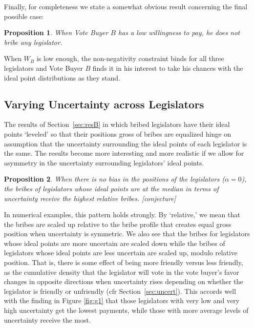 \documentclass[12pt]{article}
\newtheorem{proposition}{Proposition}
\newcommand{\al}{\alpha}
\begin{document}
Finally, for completeness we state a somewhat obvious result concerning the final possible case:

\begin{proposition}
  When Vote Buyer $B$ has a low willingness to pay, he does not bribe any legislator.
	\label{prop:0NNB}
\end{proposition}

When $W_B$ is low enough, the non-negativity constraint binds for all three legislators and Vote Buyer $B$ finds it in his interest to take his chances with the ideal point distributions as they stand.


\subsection{Varying Uncertainty across Legislators}
\label{sec:resunc}

The results of Section~\ref{sec:resB} in which bribed legislators have their ideal points `leveled' so that their positions gross of bribes are equalized hinge on assumption that the uncertainty surrounding the ideal points of each legislator is the same. The results become more interesting and more realistic if we allow for asymmetry in the uncertainty surrounding legislators' ideal points.

\begin{proposition}
  When there is no bias in the positions of the legislators ($\al =0$), the bribes of legislators whose ideal points are at the median in terms of uncertainty receive the highest relative bribes. [conjecture]
	\label{prop:asym}
\end{proposition}
In numerical examples, this pattern holds strongly. By `relative,' we mean that the bribes are scaled up relative to the bribe profile that creates equal gross position when uncertainty is symmetric. We also see that the bribes for legislators whose ideal points are more uncertain are scaled down while the bribes of legislators whose ideal points are less uncertain are scaled up, modulo relative position. That is, there is some effect of being more friendly versus less friendly, as the cumulative density that the legislator will vote in the vote buyer's favor changes in opposite directions when uncertainty rises depending on whether the legislator is friendly or unfriendly (cfr Section~\ref{sec:uncert}). This accords well with the finding in Figure \ref{fig:g1} that those legislators with very low and very high uncertainty get the lowest payments, while those with more average levels of uncertainty receive the most.
\end{document}
